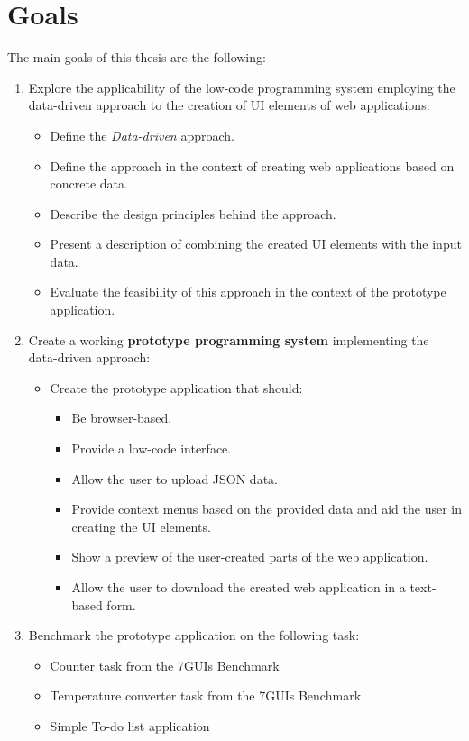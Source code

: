 \section*{Goals}
The main goals of this thesis are the following:
\begin{enumerate}
	\item Explore the applicability of the low-code programming system employing the data-driven approach to the creation of UI elements of web applications:
	      \begin{itemize}
		      \item Define the \emph{Data-driven} approach.
		      \item Define the approach in the context of creating web applications based on concrete data.
		      \item Describe the design principles behind the approach.
		      \item Present a description of combining the created UI elements with the input data.
		      \item Evaluate the feasibility of this approach in the context of the prototype application.
	      \end{itemize}
	\item Create a working \textbf{prototype programming system} implementing the data-driven approach:
	      \begin{itemize}
		      \item Create the prototype application that should:
		            \begin{itemize}
			            \item Be browser-based.
			            \item Provide a low-code interface.
			            \item Allow the user to upload JSON data.
			            \item Provide context menus based on the provided data and aid the user in creating the UI elements.
			            \item Show a preview of the user-created parts of the web application.
			            \item Allow the user to download the created web application in a text-based form.
		            \end{itemize}
	      \end{itemize}
	\item Benchmark the prototype application on the following task:
	      \begin{itemize}
		      \item Counter task from the 7GUIs Benchmark
		      \item Temperature converter task from the 7GUIs Benchmark
		      \item Simple To-do list application

	      \end{itemize}
\end{enumerate}

